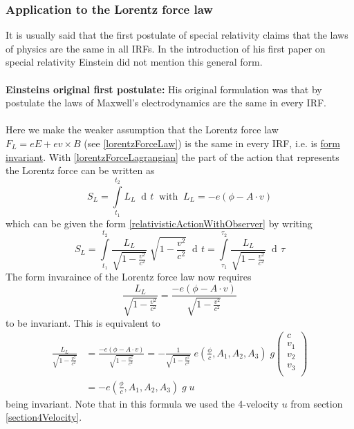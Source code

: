 \documentclass{article}
\DeclareMathOperator{\dd}{d\!}
\begin{document}
\subsubsection{Application to the Lorentz force law} \label{sectionConsequencesOfInvarianceLorentzForce}
It is usually said that the first postulate of special relativity claims that the laws of physics are the same in all IRFs.
In the introduction of his first paper on special relativity \cite{EinsteinSpecialRelativity} Einstein did not mention this general form.
\\
\\
\hypertarget{einsteinsOriginalFirstPostulate}{\textbf{Einsteins original first postulate:}}
His original formulation was that by postulate the laws of Maxwell's electrodynamics are the same in every IRF.
\\
\\
Here we make the weaker assumption that the Lorentz force law $F_L = eE + ev \times B$ (see \ref{lorentzForceLaw}) is the same in every IRF, i.e. is \hyperlink{hrefDefintionFormInvariance}{form invariant}.
With \ref{lorentzForceLagrangian} the part of the action that represents the Lorentz force can be written as
\begin{equation}
    S_L = \int\limits_{t_1}^{t_2} L_L \; \dd t \;\; \text{with} \;\; L_L = - e (\phi - A \cdot v)
\end{equation}
which can be given the form \ref{relativisticActionWithObserver} by writing
\begin{equation}
    S_L = \int\limits_{t_1}^{t_2} \frac{L_L}{\sqrt{1-\frac{v^2}{c^2}}} \; \sqrt{1-\frac{v^2}{c^2}} \; \dd t
        = \int\limits_{\tau_1}^{\tau_2} \frac{L_L}{\sqrt{1-\frac{v^2}{c^2}}} \;  \dd \tau
\end{equation}
The form invaraince of the Lorentz force law now requires
\begin{equation}
    \frac{L_L}{\sqrt{1-\frac{v^2}{c^2}}} = \frac{- e (\phi - A \cdot v)}{\sqrt{1-\frac{v^2}{c^2}}}
\end{equation}
to be invariant.
This is equivalent to
\begin{align}
    \frac{L_L}{\sqrt{1-\frac{v^2}{c^2}}} &= \frac{- e (\phi - A \cdot v)}{\sqrt{1-\frac{v^2}{c^2}}}  = - \frac{1}{\sqrt{1-\frac{v^2}{c^2}}} \; e (\frac{\phi}{c} , A_1, A_2, A_3) \; g
    \left(\begin{array}{c}
      c \\
      v_1\\
      v_2\\
      v_3\\
    \end{array} \right) \nonumber \\
    &= - e (\frac{\phi}{c} , A_1, A_2, A_3) \; g \; u \label{invariantLorentzForceLagrangian}
\end{align}
being invariant.
Note that in this formula we used the 4-velocity $u$ from section \ref{section4Velocity}.
\end{document}
